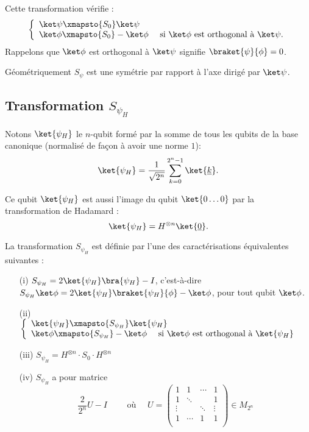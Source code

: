 \documentclass[11pt,class=report,crop=false]{standalone}
\begin{document}
Cette transformation vérifie :
$$\left\{
\begin{array}{l}
\ket\psi \xmapsto{S_0} \ket\psi \\
\ket\phi \xmapsto{S_0} -\ket\phi \quad \text{ si $\ket\phi$ est orthogonal à $\ket\psi$.} \\
\end{array}
\right.$$
Rappelons que \og{}$\ket\phi$ est orthogonal à $\ket\psi$\fg{}
signifie \og{}$\braket{\psi}{\phi}=0$\fg{}.

Géométriquement $S_\psi$ est une symétrie par rapport à l'axe dirigé par $\ket\psi$.


\subsection{Transformation $S_{\psi_H}$}

Notons $\ket{\psi_H}$ le $n$-qubit formé par la somme de tous les qubits de la base canonique (normalisé de façon à avoir une norme $1$):
$$\ket{\psi_H} = \frac{1}{\sqrt{2^n}} \sum_{k=0}^{2^n-1} \ket{\underline{k}}.$$

Ce qubit $\ket{\psi_H}$ est aussi l'image du qubit $\ket{0\ldots0}$ par la transformation de Hadamard :
$$\ket{\psi_H} =  H^{\otimes n} \ket{\underline{0}}.$$



\begin{proposition}
\label{prop:psiH}
La transformation $S_{\psi_H}$ est définie par l'une des caractérisations équivalentes suivantes :
\begin{itemize}
  \item[(i)] $S_{\psi_H} = 2 \ket{\psi_H} \bra{\psi_H} - I$,
c'est-à-dire $S_{\psi_H} \ket\phi = 2 \ket{\psi_H} \braket{\psi_H}{\phi} - \ket\phi$, pour tout qubit $\ket\phi$.

  \item[(ii)] $\left\{
\begin{array}{l}
\ket{\psi_H} \xmapsto{S_{\psi_H}} \ket{\psi_H} \\
\ket\phi \xmapsto{S_{\psi_H}} -\ket\phi \quad \text{ si $\ket\phi$ est orthogonal à $\ket{\psi_H}$} \\
\end{array}
\right.$

  \item[(iii)] $S_{\psi_H} = H^{\otimes n} \cdot S_0 \cdot H^{\otimes n}$

  \item[(iv)] $S_{\psi_H}$ a pour matrice 
$$\frac{2}{2^n} U - I \qquad \text{ où } \quad
U = 
\begin{pmatrix}
1&1&\cdots&1\\
1&\ddots &&1\\
\vdots&&\ddots &\vdots\\
1&\cdots&1&1\\
\end{pmatrix}
\in M_{2^n}$$
\end{itemize}
\end{proposition}
\end{document}
